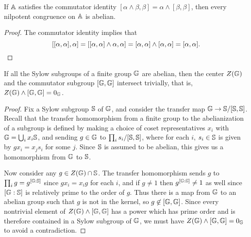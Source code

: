 \documentclass[letterpaper,11pt]{article}
\begin{document}
\begin{prop}\label{residual-nilpotent} If $\mathbb{A}$ satisfies the commutator identity $[\alpha\wedge \beta,\beta] = \alpha \wedge [\beta,\beta]$, then every nilpotent congruence on $\mathbb{A}$ is abelian.
\end{prop}
\begin{proof} The commutator identity implies that
\[
[[\alpha,\alpha],\alpha] = [[\alpha,\alpha] \wedge \alpha,\alpha] = [\alpha,\alpha]\wedge[\alpha,\alpha] = [\alpha,\alpha].\qedhere
\]
\end{proof}

\begin{prop}\label{sylow-abelian} If all the Sylow subgroups of a finite group $\mathbb{G}$ are abelian, then the center $Z(\mathbb{G})$ and the commutator subgroup $[\mathbb{G},\mathbb{G}]$ intersect trivially, that is, $Z(\mathbb{G}) \wedge [\mathbb{G},\mathbb{G}] = 0_{\mathbb{G}}$.
\end{prop}
\begin{proof} Fix a Sylow subgroup $\mathbb{S}$ of $\mathbb{G}$, and consider the transfer map $\mathbb{G} \rightarrow \mathbb{S}/[\mathbb{S},\mathbb{S}]$. Recall that the transfer homomorphism from a finite group to the abelianization of a subgroup is defined by making a choice of coset representatives $x_i$ with $\mathbb{G} = \bigcup_i x_i\mathbb{S}$, and sending $g \in \mathbb{G}$ to $\prod_i s_i/[\mathbb{S},\mathbb{S}]$, where for each $i$, $s_i \in \mathbb{S}$ is given by $gx_i = x_js_i$ for some $j$. Since $\mathbb{S}$ is assumed to be abelian, this gives us a homomorphism from $\mathbb{G}$ to $\mathbb{S}$.

Now consider any $g \in Z(\mathbb{G}) \cap \mathbb{S}$. The transfer homomorphism sends $g$ to $\prod_i g = g^{[\mathbb{G}:\mathbb{S}]}$ since $gx_i = x_ig$ for each $i$, and if $g \ne 1$ then $g^{[\mathbb{G}:\mathbb{S}]} \ne 1$ as well since $[\mathbb{G}:\mathbb{S}]$ is relatively prime to the order of $g$. Thus there is a map from $\mathbb{G}$ to an abelian group such that $g$ is not in the kernel, so $g \not\in [\mathbb{G},\mathbb{G}]$. Since every nontrivial element of $Z(\mathbb{G}) \wedge [\mathbb{G},\mathbb{G}]$ has a power which has prime order and is therefore contained in a Sylow subgroup of $\mathbb{G}$, we must have $Z(\mathbb{G}) \wedge [\mathbb{G},\mathbb{G}] = 0_{\mathbb{G}}$ to avoid a contradiction.
\end{proof}
\end{document}
